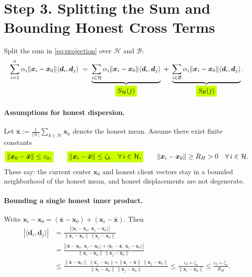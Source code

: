 \documentclass{article}
\theoremstyle{plain}
\theoremstyle{definition}
\theoremstyle{remark}
\begin{document}
\bigskip

\section*{Step 3. Splitting the Sum and Bounding Honest Cross Terms}

Split the sum in \eqref{eq:projection} over $\mathcal{H}$ and $\mathcal{B}$:
\begin{equation}
\sum_{i=1}^n \alpha_i\|\bm{x}_i-\bm{x}_0\|\langle \bm{d}_i,\bm{d}_j\rangle
\;=\;
\underbrace{\sum_{i\in \mathcal{H}} \alpha_i\|\bm{x}_i-\bm{x}_0\|\langle \bm{d}_i,\bm{d}_j\rangle}_{
  \colorbox{fluor}{%
    $\displaystyle
        S_{\mathcal{H}}(j)	
    $%
  }
}
\;+\;
\underbrace{\sum_{i\in \mathcal{B}} \alpha_i\|\bm{x}_i-\bm{x}_0\|\langle \bm{d}_i,\bm{d}_j\rangle}_{
  \colorbox{fluor}{%
    $\displaystyle
        S_{\mathcal{B}}(j)	
    $%
  }
} .
\label{eq:split}
\end{equation}

\paragraph{Assumptions for honest dispersion.}
Let $\bar{\bm{x}}:=\frac{1}{|\mathcal{H}|}\sum_{k\in \mathcal{H}} \bm{x}_k$ denote the honest mean.
Assume there exist finite constants
\begin{equation}
  \colorbox{fluor}{%
    $\displaystyle
        \|\bm{x}_0-\bar{\bm{x}}\|\le \varepsilon_0,
    $%
  }
\qquad
  \colorbox{fluor}{%
    $\displaystyle
        \|\bm{x}_i-\bar{\bm{x}}\|\le \zeta_h\quad \forall\, i\in \mathcal{H},
    $%
  }
\qquad
\|\bm{x}_i-\bm{x}_0\|\ge R_H>0\quad \forall\, i\in \mathcal{H}.
\label{eq:honest-assump}
\end{equation}
These say: the current center $\bm{x}_0$ and honest client vectors stay in a bounded neighborhood of the honest mean, and honest displacements are not degenerate.

\paragraph{Bounding a single honest inner product.}
Write $\bm{x}_i-\bm{x}_0=(\bar{\bm{x}}-\bm{x}_0)+(\bm{x}_i-\bar{\bm{x}})$.
Then
\begin{align}
|\langle \bm{d}_i,\bm{d}_j\rangle|
&= \frac{|\langle \bm{x}_i-\bm{x}_0,\ \bm{x}_j-\bm{x}_0\rangle|}{\|\bm{x}_i-\bm{x}_0\|\,\|\bm{x}_j-\bm{x}_0\|}
\nonumber\\
&= \frac{|\langle \bar{\bm{x}}-\bm{x}_0,\ \bm{x}_j-\bm{x}_0\rangle + \langle \bm{x}_i-\bar{\bm{x}},\ \bm{x}_j-\bm{x}_0\rangle|}{\|\bm{x}_i-\bm{x}_0\|\,\|\bm{x}_j-\bm{x}_0\|}
\nonumber\\
&\le \frac{\|\bar{\bm{x}}-\bm{x}_0\|\ \|\bm{x}_j-\bm{x}_0\| + \|\bm{x}_i-\bar{\bm{x}}\|\ \|\bm{x}_j-\bm{x}_0\|}{\|\bm{x}_i-\bm{x}_0\|\,\|\bm{x}_j-\bm{x}_0\|}
\le \frac{\varepsilon_0+\zeta_h}{\|\bm{x}_i-\bm{x}_0\|}
\le \frac{\varepsilon_0+\zeta_h}{R_H}.
\label{eq:single-honest-ip}
\end{align}
\end{document}
